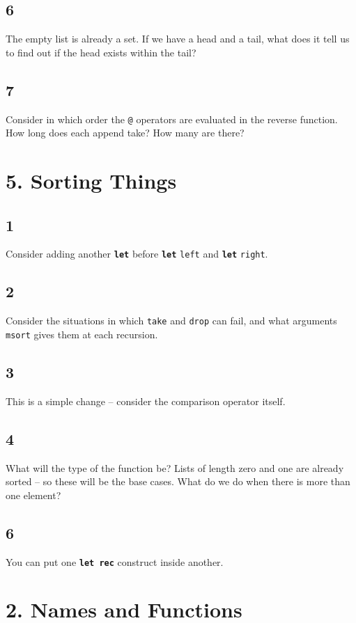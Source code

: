\documentclass[]{book}
\begin{document}
\subsection*{6}
The empty list is already a set. If we have a head and a tail, what does it tell us to find out if the head exists within the tail?
\subsection*{7}
Consider in which order the \texttt{@} operators are evaluated in the reverse function. How long does each append take? How many are there?

\section*{5. Sorting Things}
\subsection*{1}
Consider adding another \textbf{\texttt{let}} before \textbf{\texttt{let}} \texttt{left} and \textbf{\texttt{let}} \texttt{right}.

\subsection*{2}
Consider the situations in which \texttt{take} and \texttt{drop} can fail, and what arguments \texttt{msort} gives them at each recursion.

\subsection*{3}
This is a simple change -- consider the comparison operator itself.

\subsection*{4}
What will the type of the function be? Lists of length zero and one are already sorted -- so these will be the base cases. What do we do when there is more than one element?

\subsection*{6}
You can put one \textbf{\texttt{let rec}} construct inside another.

\section*{2. Names and Functions}
\end{document}
